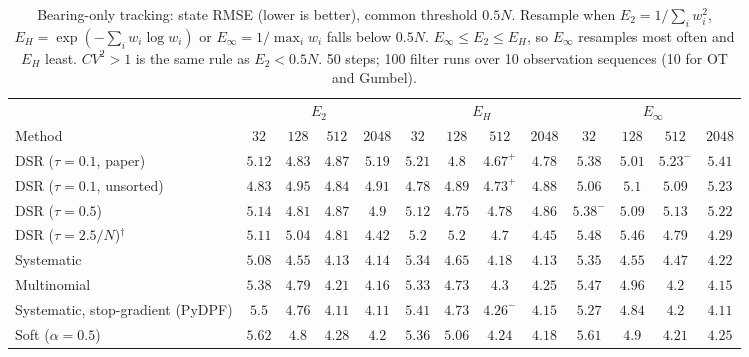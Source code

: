 \begin{table}[ht]
\centering
\small
\caption{Bearing-only tracking: state RMSE (lower is better), common threshold $0.5N$. Resample when $E_2=1/\sum_iw_i^2$, $E_H=\exp(-\sum_iw_i\log w_i)$ or $E_\infty=1/\max_iw_i$ falls below $0.5N$. $E_\infty\le E_2\le E_H$, so $E_\infty$ resamples most often and $E_H$ least. $CV^2>1$ is the same rule as $E_2<0.5N$. 50 steps; 100 filter runs over 10 observation sequences (10 for OT and Gumbel).}
\label{tab:trigger-fixed-bearing-rmse}
\begin{adjustbox}{max width=\linewidth}
\begin{tabular}{lcccc|cccc|cccc}
\toprule
 & \multicolumn{4}{c}{$E_2$} & \multicolumn{4}{c}{$E_H$} & \multicolumn{4}{c}{$E_\infty$} \\
\cmidrule(lr){2-5} \cmidrule(lr){6-9} \cmidrule(lr){10-13}
Method & $32$ & $128$ & $512$ & $2048$ & $32$ & $128$ & $512$ & $2048$ & $32$ & $128$ & $512$ & $2048$ \\
\midrule
DSR ($\tau{=}0.1$, paper) & $\mathbf{5.12}$ & $4.83$ & $4.87$ & $5.19$ & $5.21$ & $\mathbf{4.8}$ & $\mathbf{4.67}^{+}$ & $\mathbf{4.78}$ & $5.38$ & $5.01$ & $5.23^{-}$ & $5.41$ \\
DSR ($\tau{=}0.1$, unsorted) & $4.83$ & $4.95$ & $4.84$ & $4.91$ & $\mathbf{4.78}$ & $\mathbf{4.89}$ & $\mathbf{4.73}^{+}$ & $\mathbf{4.88}$ & $5.06$ & $5.1$ & $5.09$ & $5.23$ \\
DSR ($\tau{=}0.5$) & $5.14$ & $4.81$ & $4.87$ & $4.9$ & $\mathbf{5.12}$ & $\mathbf{4.75}$ & $\mathbf{4.78}$ & $\mathbf{4.86}$ & $5.38^{-}$ & $5.09$ & $5.13$ & $5.22$ \\
DSR ($\tau{=}2.5/N$)$^\dagger$ & $\mathbf{5.11}$ & $\mathbf{5.04}$ & $4.81$ & $4.42$ & $5.2$ & $5.2$ & $\mathbf{4.7}$ & $4.45$ & $5.48$ & $5.46$ & $4.79$ & $\mathbf{4.29}$ \\
\midrule
Systematic & $\mathbf{5.08}$ & $\mathbf{4.55}$ & $\mathbf{4.13}$ & $4.14$ & $5.34$ & $4.65$ & $4.18$ & $\mathbf{4.13}$ & $5.35$ & $4.55$ & $4.47$ & $4.22$ \\
Multinomial & $5.38$ & $4.79$ & $4.21$ & $4.16$ & $\mathbf{5.33}$ & $\mathbf{4.73}$ & $4.3$ & $4.25$ & $5.47$ & $4.96$ & $\mathbf{4.2}$ & $\mathbf{4.15}$ \\
Systematic, stop-gradient (PyDPF) & $5.5$ & $4.76$ & $\mathbf{4.11}$ & $4.11$ & $5.41$ & $\mathbf{4.73}$ & $4.26^{-}$ & $4.15$ & $\mathbf{5.27}$ & $4.84$ & $4.2$ & $\mathbf{4.11}$ \\
Soft ($\alpha{=}0.5$) & $5.62$ & $\mathbf{4.8}$ & $4.28$ & $4.2$ & $\mathbf{5.36}$ & $5.06$ & $4.24$ & $\mathbf{4.18}$ & $5.61$ & $4.9$ & $\mathbf{4.21}$ & $4.25$ \\

\end{tabular}
\end{adjustbox}
\end{table}
